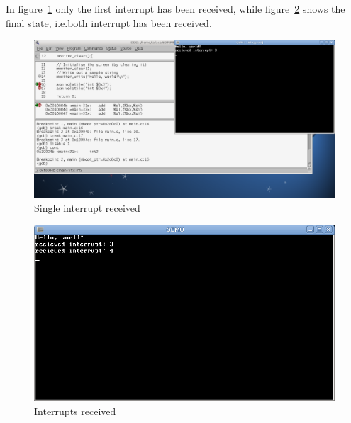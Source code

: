 \documentclass{report}
\begin{document}
In figure~\ref{isr_single_interrupt} only the first interrupt has been received, while figure~\ref{isr_final_state} shows the final state, i.e.\@ both interrupt has been received.

\begin{figure}[hbtp]
\centering
\includegraphics[scale=0.25]{images/es02/isr_single_interrupt.png}
\caption{Single interrupt received}
\label{isr_single_interrupt}
\end{figure}

\begin{figure}[hbtp]
\centering
\includegraphics[scale=0.4]{images/es02/isr_final_state.png}
\caption{Interrupts received}
\label{isr_final_state}
\end{figure}
\end{document}
